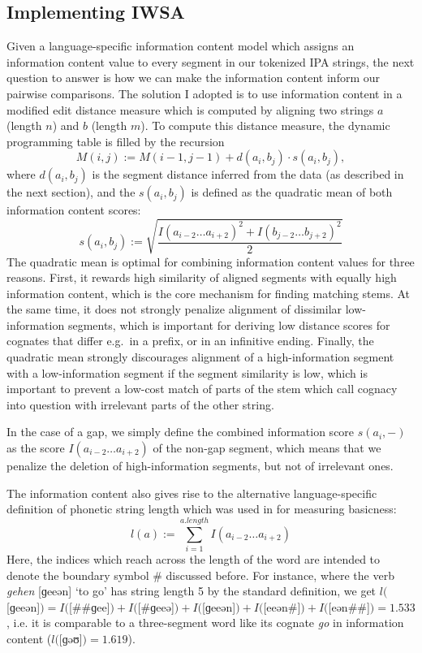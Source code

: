 \subsection{Implementing IWSA}\label{sec:4.3.3}
Given a language-specific information content model which assigns an information content value to every segment in our tokenized IPA strings, the next question to answer is how we can make the information content inform our pairwise comparisons. The solution I adopted is to use information content in a modified edit distance measure which is computed by aligning two strings $a$ (length $n$) and $b$ (length $m$). To compute this distance measure, the dynamic programming table is filled by the recursion
\begin{equation*}
M(i,j) := M(i-1,j-1) + d(a_i,b_j) \cdot s(a_i,b_j),
\end{equation*}
where $d(a_i,b_j)$ is the segment distance inferred from the data (as described in the next section), and the  $s(a_i,b_j)$ is defined as the quadratic mean of both information content scores:
\begin{equation*}
s(a_i,b_j) := \sqrt{\frac{I(a_{i-2}\dots a_{i+2})^2 + I(b_{j-2}\dots b_{j+2})^2}{2}}
\end{equation*}
The quadratic mean is optimal for combining information content values for three reasons. First, it rewards high similarity of aligned segments with equally high information content, which is the core mechanism for finding matching stems. At the same time, it does not strongly penalize alignment of dissimilar low-information segments, which is important for deriving low distance scores for cognates that differ e.g.\ in a prefix, or in an infinitive ending. Finally, the quadratic mean strongly discourages alignment of a high-information segment with a low-information segment if the segment similarity is low, which is important to prevent a low-cost match of parts of the stem which call cognacy into question with irrelevant parts of the other string.

In the case of a gap, we simply define the combined information score $s(a_i,-)$ as the score $I(a_{i-2}\dots a_{i+2})$ of the non-gap segment, which means that we penalize the deletion of high-information segments, but not of irrelevant ones.

The information content also gives rise to the alternative language-specific definition of phonetic string length which was used in \cite{dellert_buch_2015} for measuring basicness:
\begin{equation*}
l(a) := \sum_{i=1}^{a.length} I(a_{i-2}\dots a_{i+2})
\end{equation*}
Here, the indices which reach across the length of the word are intended to denote the boundary symbol $\#$ discussed before. For instance, where the  verb \textit{gehen} [ɡeeən] `to go' has string length 5 by the standard definition, we get $l($[ɡeeən]$) = I($[\#\#ɡee]$) + I($[\#ɡeeə]$) + I($[ɡeeən]$) + I($[eeən\#]$) + I($[eən\#\#]$) = 1.533$, i.e. it is comparable to a three-segment word like its  cognate \textit{go} in information content ($l($[ɡəʊ]$) = 1.619$).

